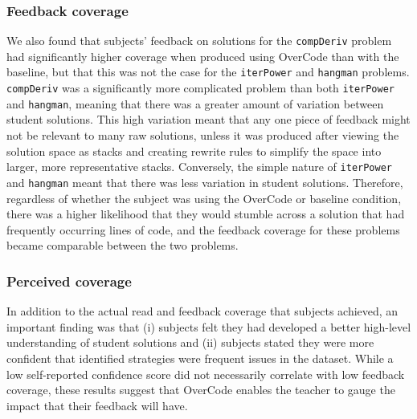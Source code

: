 \documentclass[12pt,twoside]{mitthesis}
\newcommand \codevar[1]{\texttt{#1}}
\providecommand{\DIFaddbegin}{} %
\providecommand{\DIFaddend}{} %
\providecommand{\DIFdelbegin}{} %
\providecommand{\DIFdelend}{} %
\begin{document}
\DIFdelbegin %
\DIFdelend \DIFaddbegin \subsubsection{Feedback coverage}
\DIFaddend We also found that subjects' feedback on solutions for the \codevar{compDeriv} problem had significantly higher coverage when produced using OverCode than with the baseline, but that this was not the case for the \codevar{iterPower} and \codevar{hangman} problems. \codevar{compDeriv} was a significantly more complicated problem than both \codevar{iterPower} and \codevar{hangman}, meaning that there was a greater amount of variation between student solutions. This high variation meant that any one piece of feedback might not be relevant to many raw solutions, unless it was produced after viewing the solution space as stacks and creating rewrite rules to simplify the space into larger, more representative stacks. Conversely, the simple nature of \codevar{iterPower} and \codevar{hangman} meant that there was less variation in student solutions. Therefore, regardless of whether the subject was using the OverCode or baseline condition, there was a higher likelihood that they would stumble across a solution that had frequently occurring lines of code, and the feedback coverage for these problems became comparable between the two problems.

\DIFdelbegin %
\DIFdelend \DIFaddbegin \subsubsection{Perceived coverage}
\DIFaddend In addition to the actual read and feedback coverage that subjects achieved, an important finding was that (i) subjects felt they had developed a better high-level understanding of student solutions and (ii) subjects stated they were more confident that identified strategies were frequent issues in the dataset. While a low self-reported confidence score did not necessarily correlate with low feedback coverage, these results suggest that OverCode enables the teacher to gauge the impact that their feedback will have.
\end{document}
